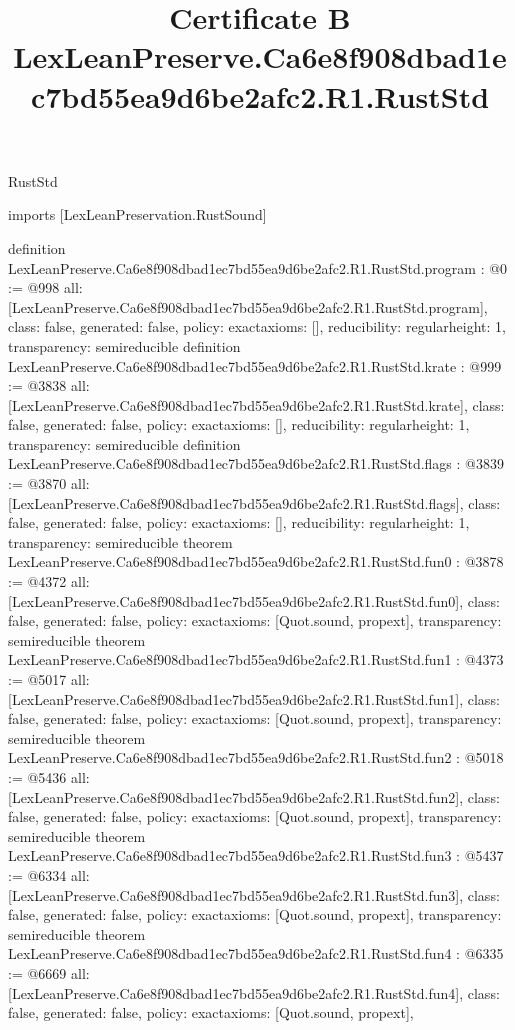 \begin{lexlean}{RustStd}
\title{Certificate B LexLeanPreserve.Ca6e8f908dbad1ec7bd55ea9d6be2afc2.R1.RustStd}
\begin{coremodule}
imports [LexLeanPreservation.RustSound]

definition LexLeanPreserve.Ca6e8f908dbad1ec7bd55ea9d6be2afc2.R1.RustStd.program : @0 := @998 {
  all: [LexLeanPreserve.Ca6e8f908dbad1ec7bd55ea9d6be2afc2.R1.RustStd.program],
  class: false,
  generated: false,
  policy: exact{axioms: []},
  reducibility: regular{height: 1},
  transparency: semireducible
}
definition LexLeanPreserve.Ca6e8f908dbad1ec7bd55ea9d6be2afc2.R1.RustStd.krate : @999 := @3838 {
  all: [LexLeanPreserve.Ca6e8f908dbad1ec7bd55ea9d6be2afc2.R1.RustStd.krate],
  class: false,
  generated: false,
  policy: exact{axioms: []},
  reducibility: regular{height: 1},
  transparency: semireducible
}
definition LexLeanPreserve.Ca6e8f908dbad1ec7bd55ea9d6be2afc2.R1.RustStd.flags : @3839 := @3870 {
  all: [LexLeanPreserve.Ca6e8f908dbad1ec7bd55ea9d6be2afc2.R1.RustStd.flags],
  class: false,
  generated: false,
  policy: exact{axioms: []},
  reducibility: regular{height: 1},
  transparency: semireducible
}
theorem LexLeanPreserve.Ca6e8f908dbad1ec7bd55ea9d6be2afc2.R1.RustStd.fun0 : @3878 := @4372 {
  all: [LexLeanPreserve.Ca6e8f908dbad1ec7bd55ea9d6be2afc2.R1.RustStd.fun0],
  class: false,
  generated: false,
  policy: exact{axioms: [Quot.sound, propext]},
  transparency: semireducible
}
theorem LexLeanPreserve.Ca6e8f908dbad1ec7bd55ea9d6be2afc2.R1.RustStd.fun1 : @4373 := @5017 {
  all: [LexLeanPreserve.Ca6e8f908dbad1ec7bd55ea9d6be2afc2.R1.RustStd.fun1],
  class: false,
  generated: false,
  policy: exact{axioms: [Quot.sound, propext]},
  transparency: semireducible
}
theorem LexLeanPreserve.Ca6e8f908dbad1ec7bd55ea9d6be2afc2.R1.RustStd.fun2 : @5018 := @5436 {
  all: [LexLeanPreserve.Ca6e8f908dbad1ec7bd55ea9d6be2afc2.R1.RustStd.fun2],
  class: false,
  generated: false,
  policy: exact{axioms: [Quot.sound, propext]},
  transparency: semireducible
}
theorem LexLeanPreserve.Ca6e8f908dbad1ec7bd55ea9d6be2afc2.R1.RustStd.fun3 : @5437 := @6334 {
  all: [LexLeanPreserve.Ca6e8f908dbad1ec7bd55ea9d6be2afc2.R1.RustStd.fun3],
  class: false,
  generated: false,
  policy: exact{axioms: [Quot.sound, propext]},
  transparency: semireducible
}
theorem LexLeanPreserve.Ca6e8f908dbad1ec7bd55ea9d6be2afc2.R1.RustStd.fun4 : @6335 := @6669 {
  all: [LexLeanPreserve.Ca6e8f908dbad1ec7bd55ea9d6be2afc2.R1.RustStd.fun4],
  class: false,
  generated: false,
  policy: exact{axioms: [Quot.sound, propext]},
}
\end{coremodule}
\end{lexlean}
